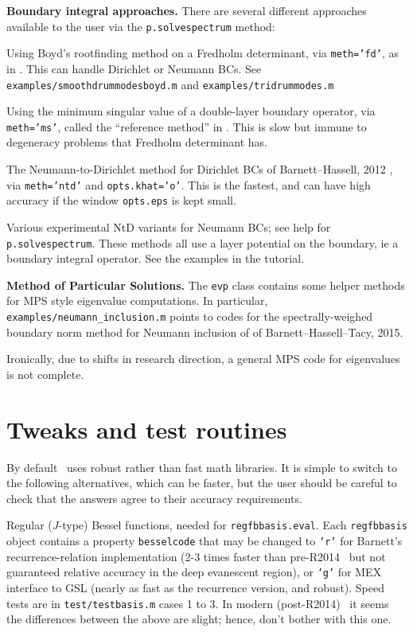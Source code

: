 \documentclass[12pt]{article}
\begin{document}
{\bf Boundary integral approaches.}
There are several different approaches available to the user
via the {\tt p.solvespectrum} method:
\ben
\item Using Boyd's rootfinding method on a Fredholm determinant,
via {\tt meth='fd'}, as in \cite{zhaodet}. This can handle Dirichlet or
Neumann BCs. See {\tt examples/smoothdrummodesboyd.m} and {\tt examples/tridrummodes.m}
\item Using the minimum singular value of a double-layer boundary operator,
via {\tt meth='ms'}, called the ``reference method'' in \cite{sca}.
This is slow but immune to degeneracy problems that Fredholm determinant has.
\item The Neumann-to-Dirichlet method for Dirichlet BCs of Barnett--Hassell, 2012 \cite{sca}, via {\tt meth='ntd'} and {\tt opts.khat='o'}.
This is the fastest, and can have high accuracy if the window {\tt opts.eps}
is kept small.
\item Various experimental NtD variants for Neumann BCs; see help for
{\tt p.solvespectrum}.
\een
These methods all use a layer potential on the boundary, ie a boundary integral
operator. See the examples in the tutorial.

{\bf Method of Particular Solutions.}
The {\tt evp} class contains some helper methods for MPS style
eigenvalue computations.
In particular, \verb+examples/neumann_inclusion.m+ points to codes for
the spectrally-weighed boundary norm method for Neumann inclusion of
of Barnett--Hassell--Tacy, 2015.

Ironically, due to shifts in research direction,
a general MPS code for eigenvalues is not complete.




\section{Tweaks and test routines}
\label{s:tweak}

By default \mpspack\ uses robust rather than fast math libraries.
It is simple to switch to the following
alternatives, which can be faster, but the user should be careful
to check that the answers agree to their accuracy requirements.

\ben
\item Regular ($J$-type) Bessel functions, needed for {\tt regfbbasis.eval}.
Each {\tt regfbbasis} object contains a property {\tt besselcode}
that may be changed to {\tt 'r'} for Barnett's recurrence-relation
implementation (2-3 times faster than pre-R2014 \matlab\ but
not guaranteed relative accuracy in
the deep evanescent region),
or {\tt 'g'} for MEX interface to GSL (nearly as fast as the recurrence
version, and robust).
Speed tests are in {\tt test/testbasis.m} cases 1 to 3.
In modern (post-R2014) \matlab\ it seems the differences between the
above are slight; hence, don't bother with this one.
\end{document}
